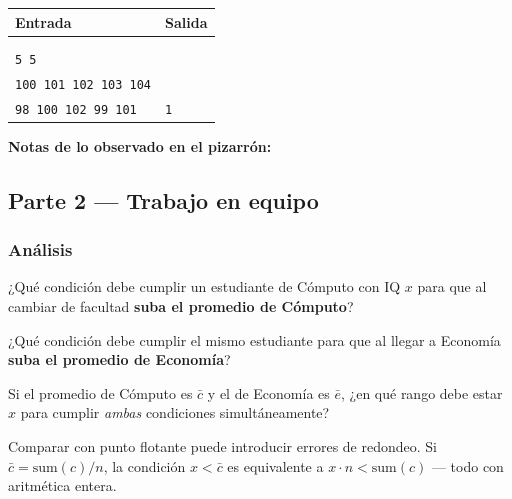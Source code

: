 \documentclass[12pt, oneside]{article}
\begin{document}
\begin{center}
\begin{tabular}{ll}
  \toprule
  \textbf{Entrada} & \textbf{Salida} \\
  \midrule
  \begin{minipage}[t]{4cm}
    \texttt{1}\\
    \texttt{}\\
    \texttt{5 5}\\
    \texttt{100 101 102 103 104}\\
    \texttt{98 100 102 99 101}
  \end{minipage}
  &
  \begin{minipage}[t]{4cm}
    \texttt{1}
  \end{minipage} \\
  \bottomrule
\end{tabular}
\end{center}

\textbf{Notas de lo observado en el pizarrón:}

\vspace{3cm}

\subsection{Parte 2 — Trabajo en equipo}

\subsubsection{Análisis}

¿Qué condición debe cumplir un estudiante de Cómputo con IQ $x$ para que
al cambiar de facultad \textbf{suba el promedio de Cómputo}?

\vspace{3cm}

¿Qué condición debe cumplir el mismo estudiante para que al llegar a Economía
\textbf{suba el promedio de Economía}?

\vspace{3cm}

Si el promedio de Cómputo es $\bar{c}$ y el de Economía es $\bar{e}$,
¿en qué rango debe estar $x$ para cumplir \textit{ambas} condiciones
simultáneamente?

\vspace{2cm}

\begin{recuerda}
  Comparar con punto flotante puede introducir errores de redondeo.  Si
  $\bar{c} = \text{sum}(c)/n$, la condición $x < \bar{c}$ es equivalente a
  $x \cdot n < \text{sum}(c)$ — todo con aritmética entera.
\end{recuerda}
\end{document}
